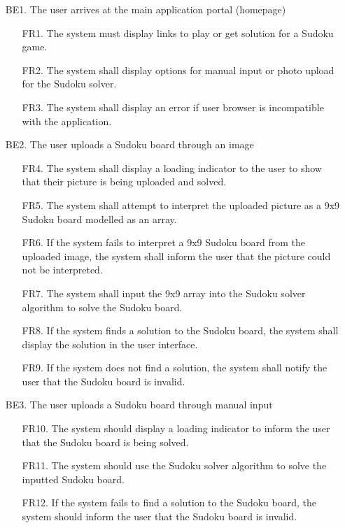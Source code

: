 \documentclass[11pt]{article}
\begin{document}
\begin{enumerate}
    \item [BE1.] The user arrives at the main application portal (homepage)
    \begin{enumerate}
        \item [FR1.] The system must display links to play or get solution for a Sudoku game.
        \item [FR2.] The system shall display options for manual input or photo upload for the Sudoku solver.
        \item [FR3.] The system shall display an error if user browser is incompatible with the application.
    \end{enumerate}
    \item [BE2.] The user uploads a Sudoku board through an image
    \begin{enumerate}
        \item [FR4.] The system shall display a loading indicator to the user to show that their picture is being uploaded and solved.
        \item [FR5.] The system shall attempt to interpret the uploaded picture as a 9x9 Sudoku board modelled as an array.
        \item [FR6.] If the system fails to interpret a 9x9 Sudoku board from the uploaded image, the system shall inform the user that the picture could not be interpreted.
        \item [FR7.] The system shall input the 9x9 array into the Sudoku solver algorithm to solve the Sudoku board.
        \item [FR8.] If the system finds a solution to the Sudoku board, the system shall display the solution in the user interface.
        \item [FR9.] If the system does not find a solution, the system shall notify the user that the Sudoku board is invalid.
    \end{enumerate}
    \item [BE3.] The user uploads a Sudoku board through manual input
    \begin{enumerate}
        \item [FR10.] The system should display a loading indicator to inform the user that the Sudoku board is being solved.
        \item [FR11.] The system should use the Sudoku solver algorithm to solve the inputted Sudoku board.
        \item [FR12.] If the system fails to find a solution to the Sudoku board, the system should inform the user that the Sudoku board is invalid.

\end{enumerate}
\end{enumerate}
\end{document}
